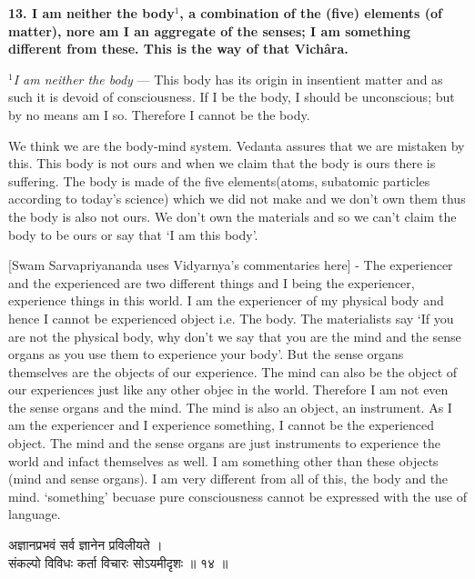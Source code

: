 \documentclass{article}
\begin{document}
\textbf{ 13. I am neither the body$^1$, a combination of the (five) elements
(of matter), nore am I an aggregate of the senses; I am something different
from these. This is the way of that Vichâra.  }

{\small\textit{$^1$I am neither the body} --- This body has its origin in
insentient matter and as such it is devoid of consciousness. If I be the body,
I should be unconscious; but by no means am I so. Therefore I cannot be the
body.}

\begin{oframed}

We think we are the body-mind system. Vedanta assures that we are mistaken by
this.  This body is not ours and when we claim that the body is ours there
is suffering. The body is made of the five elements(atoms, subatomic
particles according to  today's science) which we did not make and we don't
own them thus the body is also not ours. We don't own the materials and so
we can't claim the body to be ours or say that `I am this body'.

[Swam Sarvapriyananda uses Vidyarnya's commentaries here] - The experiencer
and the experienced are two different things and I being the experiencer,
experience things in this world. I am the experiencer of my physical body
and hence I cannot be experienced object i.e. The body.  The materialists
say `If you are not the physical body, why don't we say that you are the
mind and the sense organs as you use them to experience your body'. But the
sense organs themselves are the objects of our experience.  The mind can
also be the object of our experiences just like any other objec in the
world. Therefore I am not even the sense organs and the mind.  The mind is
also an object, an instrument. As I am the experiencer and I experience
something, I cannot be the experienced object.  The mind and the sense
organs are just instruments to experience the world and infact themselves
as well. I am something other than these objects (mind and sense organs). I
am very different from all of this, the body and the mind. `something'
becuase pure consciousness cannot be expressed with the use of language.

\end{oframed}


\bigskip

\begin{large}
\begin{center}
    \begin{hindi}
    अज्ञानप्रभवं सर्व ज्ञानेन प्रविलीयते ।\\
    संकल्पो विविधः कर्ता विचारः सोऽयमीदृशः ॥ १४ ॥
    \end{hindi}
\end{center}
\end{large}
\end{document}
